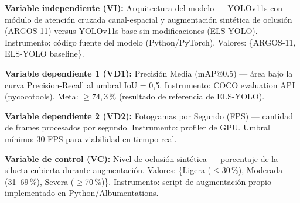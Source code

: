 \noindent\textbf{Variable independiente (VI):} Arquitectura del
modelo --- YOLOv11s con m\'odulo de atenci\'on cruzada
canal-espacial y augmentaci\'on sint\'etica de oclusi\'on
(ARGOS-11) versus YOLOv11s base sin modificaciones (ELS-YOLO).
Instrumento: c\'odigo fuente del modelo (Python/PyTorch).
Valores: \{ARGOS-11, ELS-YOLO baseline\}.

\vspace{0.5cm}
\noindent\textbf{Variable dependiente 1 (VD1):} Precisi\'on Media
(mAP@0.5) --- \'area bajo la curva Precision-Recall al umbral
IoU = 0{,}5. Instrumento: COCO evaluation API (pycocotools).
Meta: $\geq 74{,}3\,\%$ (resultado de referencia de ELS-YOLO).

\vspace{0.5cm}
\noindent\textbf{Variable dependiente 2 (VD2):} Fotogramas por
Segundo (FPS) --- cantidad de frames procesados por segundo.
Instrumento: profiler de GPU. Umbral m\'{i}nimo: 30 FPS para
viabilidad en tiempo real.

\vspace{0.5cm}
\noindent\textbf{Variable de control (VC):} Nivel de oclusi\'on
sint\'etica --- porcentaje de la silueta cubierta durante
augmentaci\'on. Valores: \{Ligera ($\leq$30\,\%), Moderada
(31--69\,\%), Severa ($\geq$70\,\%)\}. Instrumento: script de
augmentaci\'on propio implementado en Python/Albumentations.

